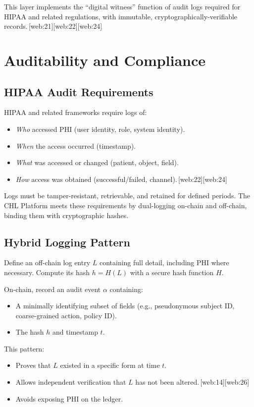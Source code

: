 \documentclass[11pt]{article}
\begin{document}
This layer implements the ``digital witness'' function of audit logs required for HIPAA and related regulations, with immutable, cryptographically-verifiable records.\,[web:21][web:22][web:24]

\section{Auditability and Compliance}

\subsection{HIPAA Audit Requirements}

HIPAA and related frameworks require logs of:
\begin{itemize}[nosep]
  \item \emph{Who} accessed PHI (user identity, role, system identity).
  \item \emph{When} the access occurred (timestamp).
  \item \emph{What} was accessed or changed (patient, object, field).
  \item \emph{How} access was obtained (successful/failed, channel).\,[web:22][web:24]
\end{itemize}

Logs must be tamper-resistant, retrievable, and retained for defined periods. 
The CHL Platform meets these requirements by dual-logging on-chain and off-chain, binding them with cryptographic hashes.

\subsection{Hybrid Logging Pattern}

Define an off-chain log entry $L$ containing full detail, including PHI where necessary. 
Compute its hash $h = H(L)$ with a secure hash function $H$.

On-chain, record an audit event $\alpha$ containing:
\begin{itemize}[nosep]
  \item A minimally identifying subset of fields (e.g., pseudonymous subject ID, coarse-grained action, policy ID).
  \item The hash $h$ and timestamp $t$.
\end{itemize}

This pattern:
\begin{itemize}[nosep]
  \item Proves that $L$ existed in a specific form at time $t$.
  \item Allows independent verification that $L$ has not been altered.\,[web:14][web:26]
  \item Avoids exposing PHI on the ledger.
\end{itemize}
\end{document}
